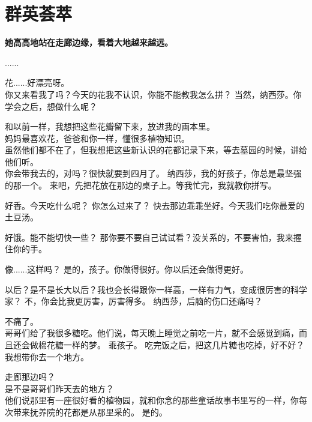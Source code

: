 \documentclass[openany]{book}
\begin{document}
\chapter{群英荟萃}
\begin{center} \textbf{她高高地站在走廊边缘，看着大地越来越远。}\end{center} \par
\clearpage

\begin{dialogue}
     ......\par
    花......好漂亮呀。\\
    你又来看我了吗？今天的花我不认识，你能不能教我怎么拼？
     当然，纳西莎。你学会之后，想做什么呢？\par
    和以前一样，我想把这些花瓣留下来，放进我的画本里。\\
    妈妈最喜欢花，爸爸和你一样，懂很多植物知识。\\
    虽然他们都不在了，但我想把这些新认识的花都记录下来，等去墓园的时候，讲给他们听。\\
    你会带我去的，对吗？很快就要到四月了。
     纳西莎，我的好孩子，你总是最坚强的那一个。
     来吧，先把花放在那边的桌子上。等我忙完，我就教你拼写。\par
    好香。今天吃什么呢？
     你怎么过来了？
     快去那边乖乖坐好。今天我们吃你最爱的土豆汤。\par
    好饿。能不能切快一些？
     那你要不要自己试试看？没关系的，不要害怕，我来握住你的手。\par
    像......这样吗？
     是的，孩子。你做得很好。你以后还会做得更好。\par
    以后？是不是长大以后？我也会长得跟你一样高，一样有力气，变成很厉害的科学家？
     不，你会比我更厉害，厉害得多。
     纳西莎，后脑的伤口还痛吗？\par
    不痛了。\\
    哥哥们给了我很多糖吃。他们说，每天晚上睡觉之前吃一片，就不会感觉到痛，而且还会做棉花糖一样的梦。
     乖孩子。
     吃完饭之后，把这几片糖也吃掉，好不好？我想带你去一个地方。\par
    走廊那边吗？\\
    是不是哥哥们昨天去的地方？\\
    他们说那里有一座很好看的植物园，就和你念的那些童话故事书里写的一样，你每次带来抚养院的花都是从那里采的。
     是的。

\end{dialogue}
\end{document}
